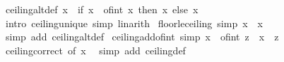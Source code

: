 \begin{isabellebody}
\endisatagproof
{\isafoldproof}%
%
\isadelimproof
\isanewline
%
\endisadelimproof
\isanewline
{}\isamarkupfalse%
\ ceiling{\isacharunderscore}{\kern0pt}altdef{\isacharcolon}{\kern0pt}\ {\isachardoublequoteopen}{\isasymlceil}x{\isasymrceil}\ {\isacharequal}{\kern0pt}\ {\isacharparenleft}{\kern0pt}if\ x\ {\isacharequal}{\kern0pt}\ of{\isacharunderscore}{\kern0pt}int\ {\isasymlfloor}x{\isasymrfloor}\ then\ {\isasymlfloor}x{\isasymrfloor}\ else\ {\isasymlfloor}x{\isasymrfloor}\ {\isacharplus}{\kern0pt}\ {}{\isacharparenright}{\kern0pt}{\isachardoublequoteclose}\isanewline
%
\isadelimproof
\ \ %
\endisadelimproof
%
\isatagproof
{}\isamarkupfalse%
\ {\isacharparenleft}{\kern0pt}intro\ ceiling{\isacharunderscore}{\kern0pt}unique{\isacharsemicolon}{\kern0pt}\ simp{\isacharcomma}{\kern0pt}\ linarith{\isacharquery}{\kern0pt}{\isacharparenright}{\kern0pt}%
\endisatagproof
{\isafoldproof}%
%
\isadelimproof
\isanewline
%
\endisadelimproof
\isanewline
{}\isamarkupfalse%
\ floor{\isacharunderscore}{\kern0pt}le{\isacharunderscore}{\kern0pt}ceiling\ {\isacharbrackleft}{\kern0pt}simp{\isacharbrackright}{\kern0pt}{\isacharcolon}{\kern0pt}\ {\isachardoublequoteopen}{\isasymlfloor}x{\isasymrfloor}\ {\isasymle}\ {\isasymlceil}x{\isasymrceil}{\isachardoublequoteclose}\isanewline
%
\isadelimproof
\ \ %
\endisadelimproof
%
\isatagproof
{}\isamarkupfalse%
\ {\isacharparenleft}{\kern0pt}simp\ add{\isacharcolon}{\kern0pt}\ ceiling{\isacharunderscore}{\kern0pt}altdef{\isacharparenright}{\kern0pt}%
\endisatagproof
{\isafoldproof}%
%
\isadelimproof
%
\endisadelimproof
%
\isadelimdocument
%
\endisadelimdocument
%
\isatagdocument
%
\isamarkuptrue%
%
\endisatagdocument
{\isafolddocument}%
%
\isadelimdocument
%
\endisadelimdocument
{}\isamarkupfalse%
\ ceiling{\isacharunderscore}{\kern0pt}add{\isacharunderscore}{\kern0pt}of{\isacharunderscore}{\kern0pt}int\ {\isacharbrackleft}{\kern0pt}simp{\isacharbrackright}{\kern0pt}{\isacharcolon}{\kern0pt}\ {\isachardoublequoteopen}{\isasymlceil}x\ {\isacharplus}{\kern0pt}\ of{\isacharunderscore}{\kern0pt}int\ z{\isasymrceil}\ {\isacharequal}{\kern0pt}\ {\isasymlceil}x{\isasymrceil}\ {\isacharplus}{\kern0pt}\ z{\isachardoublequoteclose}\isanewline
%
\isadelimproof
\ \ %
\endisadelimproof
%
\isatagproof
{}\isamarkupfalse%
\ ceiling{\isacharunderscore}{\kern0pt}correct\ {\isacharbrackleft}{\kern0pt}of\ x{\isacharbrackright}{\kern0pt}\ \isamarkupfalse%
\ {\isacharparenleft}{\kern0pt}simp\ add{\isacharcolon}{\kern0pt}\ ceiling{\isacharunderscore}{\kern0pt}def{\isacharparenright}{\kern0pt}%

\end{isabellebody}
